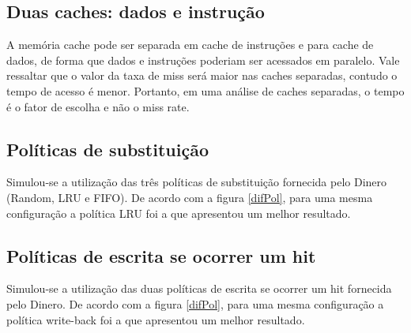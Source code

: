 \documentclass[12pt,a4paper]{article}
\begin{document}


\subsection{Duas caches:  dados e  instrução}
A memória cache pode ser separada em cache de instruções e para cache de dados,
de forma que dados e instruções poderiam ser acessados em paralelo. 
Vale ressaltar que o valor da taxa de miss será maior nas caches
separadas, contudo o tempo de acesso é menor.
Portanto, em uma análise de caches separadas, o tempo é o fator de
escolha e não o miss rate.

\subsection{Políticas de substituição}
Simulou-se a utilização das três políticas de substituição fornecida
pelo Dinero (Random, LRU e FIFO).
De acordo com a figura \ref{difPol}, para uma mesma configuração a política LRU foi a que apresentou um
melhor resultado.



\subsection{Políticas de escrita se ocorrer um hit}
Simulou-se a utilização das duas políticas de escrita se ocorrer um
hit fornecida pelo Dinero.
De acordo com a figura \ref{difPol}, para uma mesma configuração a política write-back foi a que apresentou um
melhor resultado.
\end{document}
